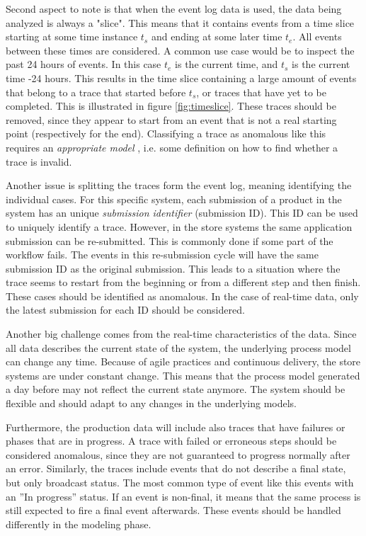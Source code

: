 \documentclass[english,12pt,a4paper,pdftex,sci,utf8]{aaltothesis}
\theoremstyle{definition}
\begin{document}
Second aspect to note is that when the event log data is used, the data being analyzed is always a "slice".
This means that it contains events from a time slice starting at some time instance $t_s$ and ending at some later time $t_e$. All events between these times are considered. A common use case would be to inspect the past 24 hours of events. In this case $t_e$ is the current time, and $t_s$ is the current time -24 hours. 
This results in the time slice containing a large amount of events that belong to a trace that started before $t_s$, or traces that have yet to be completed. This is illustrated in figure \ref{fig:timeslice}. These traces should be removed, since they appear to start from an event that is not a real starting point (respectively for the end). Classifying a trace as anomalous like this requires an \emph{appropriate model} \cite{bezerra2009anomaly}, 
i.e. some definition on how to find whether a trace is invalid.

Another issue is splitting the traces form the event log, meaning identifying the individual cases.
For this specific system, each submission of a product in the system has an unique \emph{submission identifier} (submission ID).
This ID can be used to uniquely identify a trace. 
However, in the store systems the same application submission can be re-submitted.
This is commonly done if some part of the workflow fails.
The events in this re-submission cycle will have the same submission ID as the original submission.
This leads to a situation where the trace seems to restart from the beginning or from a different step and then finish. These cases should be identified as anomalous. In the case of real-time data, only the latest submission for each ID should be considered.

Another big challenge comes from the real-time characteristics of the data. Since all data describes the current state of the system, the underlying process model can change any time. Because of agile practices and continuous delivery, the store systems are under constant change. This means that the process model generated a day before may not reflect the current state anymore. The system should be flexible and should adapt to any changes in the underlying models.

Furthermore, the production data will include also traces that have failures or phases that are in progress.
A trace with failed or erroneous steps should be considered anomalous, since they are not guaranteed to progress normally after an error. 
Similarly, the traces include events that do not describe a final state, but only broadcast status. 
The most common type of event like this events with an ''In progress'' status.
If an event is non-final, it means that the same process is still expected to fire a final event afterwards.
These events should be handled differently in the modeling phase.
\end{document}
